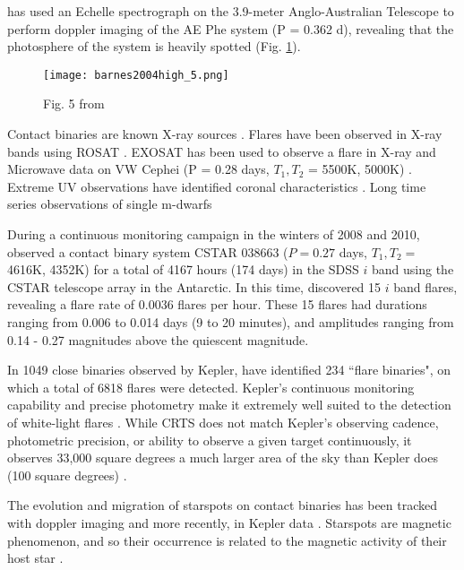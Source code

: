 \documentclass[12pt]{article} %
\numberwithin{equation}{section} %
\begin{document}
\citet{barnes2004high} has used an Echelle spectrograph on the 3.9-meter Anglo-Australian Telescope to perform doppler imaging of the AE Phe system (P = 0.362 d), revealing that the photosphere of the system is heavily spotted (Fig. \ref{fig: barnes2004high_5}).

\begin{figure}[H]
\centering
\texttt{[image: barnes2004high\_5.png]}
\caption{Fig. 5 from \citet{barnes2004high}}
\label{fig: barnes2004high_5}
\end{figure}

Contact binaries are known X-ray sources \citep{chen2006w}. Flares have been observed in X-ray bands using ROSAT \citep{mcgale1996rosat}.
EXOSAT has been used to observe a flare in X-ray and Microwave data on VW Cephei (P =  0.28 days, $T_{1}, T_{2}$ = 5500K, 5000K) \citep{vilhu1988simultaneous}. Extreme UV observations have identified coronal characteristics \citep{brickhouse1998extreme}. Long time series observations of single m-dwarfs  \citep{lacy1976uv}

During a continuous monitoring campaign in the winters of 2008 and 2010, \citet{qian2014optical} observed a contact binary system CSTAR 038663 ($P = 0.27$ days, $T_{1}, T_{2} =$ 4616K, 4352K) for a total of 4167 hours (174 days) in the SDSS $i$ band using the CSTAR telescope array in the Antarctic. In this time, \citet{qian2014optical} discovered 15 $i$ band flares, revealing a flare rate of $0.0036$ flares per hour. These 15 flares had durations ranging from 0.006 to 0.014 days (9 to 20 minutes), and amplitudes ranging from 0.14 - 0.27 magnitudes above the quiescent magnitude.

In 1049 close binaries observed by Kepler, \citet{gao2016white} have identified 234 ``flare binaries", on which a total of 6818 flares were detected. Kepler's continuous monitoring capability and precise photometry make it extremely well suited to the detection of white-light flares \citep{walkowicz2011white}. While CRTS does not match Kepler's observing cadence, photometric precision, or ability to observe a given target continuously, it observes 33,000 square degrees a much larger area of the sky than Kepler does (100 square degrees) \citep{drake2009first, basri2005kepler}.

The evolution and migration of starspots on contact binaries has been tracked with doppler imaging \citep{hendry2000doppler} and more recently, in Kepler data \citep{tran2013anticorrelated, balaji2015tracking}. Starspots are magnetic phenomenon, and so their occurrence is related to the magnetic activity of their host star \citep{berdyugina2005starspots}.  
\end{document}
